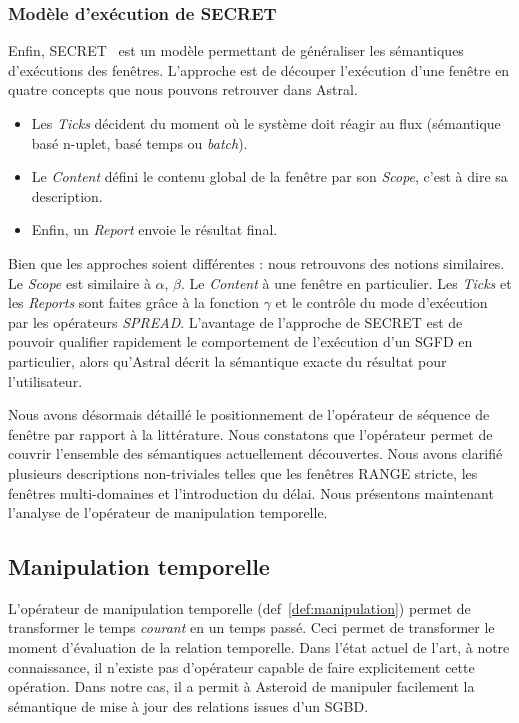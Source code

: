 \subsubsection{Modèle d'exécution de SECRET}
Enfin, SECRET~\cite{Botan:secret} est un modèle permettant de généraliser les sémantiques d'exécutions des fenêtres. L'approche est de découper l'exécution d'une fenêtre en quatre concepts que nous pouvons retrouver dans Astral.
\begin{itemize}
	\item Les \textit{Ticks} décident du moment où le système doit réagir au flux (sémantique basé n-uplet, basé temps ou \textit{batch}).
	\item Le \textit{Content} défini le contenu global de la fenêtre par son \textit{Scope}, c'est à dire sa description.
	\item Enfin, un \textit{Report} envoie le résultat final.
\end{itemize}

Bien que les approches soient différentes : nous retrouvons des notions similaires. Le \textit{Scope} est similaire à $\alpha$, $\beta$. Le \textit{Content} à une fenêtre en particulier. Les \textit{Ticks} et les \textit{Reports} sont faites grâce à la fonction $\gamma$ et le contrôle du mode d'exécution par les opérateurs \textit{SPREAD}. L'avantage de l'approche de SECRET est de pouvoir qualifier rapidement le comportement de l'exécution d'un SGFD en particulier, alors qu'Astral décrit la sémantique exacte du résultat pour l'utilisateur.

Nous avons désormais détaillé le positionnement de l'opérateur de séquence de fenêtre par rapport à la littérature. Nous constatons que l'opérateur permet de couvrir l'ensemble des sémantiques actuellement découvertes. Nous avons clarifié plusieurs descriptions non-triviales telles que les fenêtres RANGE stricte, les fenêtres multi-domaines et l'introduction du délai. Nous présentons maintenant l'analyse de l'opérateur de manipulation temporelle.

\subsection{Manipulation temporelle}
L'opérateur de manipulation temporelle (def~\ref{def:manipulation}) permet de transformer le temps \textit{courant} en un temps passé. Ceci permet de transformer le moment d'évaluation de la relation temporelle. Dans l'état actuel de l'art, à notre connaissance, il n'existe pas d'opérateur capable de faire explicitement cette opération. Dans notre cas, il a permit à Asteroid de manipuler facilement la sémantique de mise à jour des relations issues d'un SGBD.

